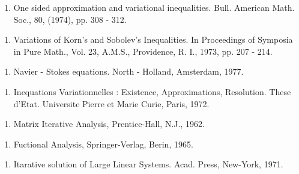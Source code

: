 \begin{thebibliography}{99}

  \begin{enumerate}
  \item One sided approximation and variational
 inequalities. Bull. American Math. Soc., 80, (1974), pp. 308 -
 312.\label{k86:e1}
  \end{enumerate}


  \begin{enumerate}
  \item Variations of Korn's and Sobolev's Inequalities. In
 Proceedings of Symposia in Pure Math., Vol. 23, A.M.S.,
 Providence, R. I., 1973, pp. 207 - 214.\label{k87:e1} 
  \end{enumerate}


  \begin{enumerate}
  \item Navier - Stokes equations. North - Holland, Amsterdam,
 1977.\label{k88:e1}
  \end{enumerate}


  \begin{enumerate}
  \item Inequations Variationnelles : Existence, Approximations,
 Resolution. These d'Etat. Universite Pierre et Marie Curie, Paris,
 1972.\label{k89:e1} 
  \end{enumerate}


  \begin{enumerate}
  \item Matrix Iterative Analysis, Prentice-Hall, N.J.,
 1962.\label{k90:e1}
  \end{enumerate}


  \begin{enumerate}
  \item Fuctional Analysis, Springer-Verlag, Berin, 1965.\label{k91:e1}
  \end{enumerate}


  \begin{enumerate}
  \item {Itarative solution of Large Linear Systems. Acad. Press,
 New-York, 1971.}\label{k92:e1}
  \end{enumerate}
\end{thebibliography}

